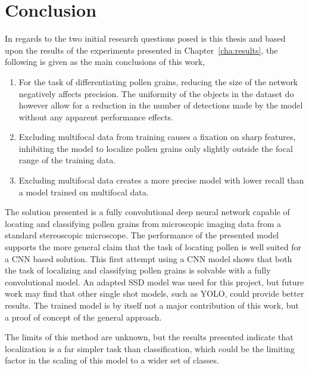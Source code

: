 \chapter{Conclusion}\label{cha:conclusion}


In regards to the two initial research questions posed is this thesis and based upon the results of the experiments presented in Chapter~\ref{cha:results}, the following is given as the main conclusions of this work,

\begin{enumerate}
    \item For the task of differentiating pollen grains, reducing the size of the network negatively affects precision. The uniformity of the objects in the dataset do however allow for a reduction in the number of detections made by the model without any apparent performance effects.
    \item Excluding multifocal data from training causes a fixation on sharp features, inhibiting the model to localize pollen grains only slightly outside the focal range of the training data.
    \item Excluding multifocal data creates a more precise model with lower recall than a model trained on multifocal data.
\end{enumerate}

The solution presented is a fully convolutional deep neural network capable of locating and classifying pollen grains from microscopic imaging data from a standard stereoscopic microscope.
The performance of the presented model supports the more general claim that the task of locating pollen is well suited for a CNN based solution.
This first attempt using a CNN model shows that both the task of localizing and classifying pollen grains is solvable with a fully convolutional model.
An adapted SSD model was used for this project, but future work may find that other single shot models, such as YOLO, could provide better results.
The trained model is by itself not a major contribution of this work, but a proof of concept of the general approach.

The limits of this method are unknown, but the results presented indicate that localization is a far simpler task than classification, which could be the limiting factor in the scaling of this model to a wider set of classes.

